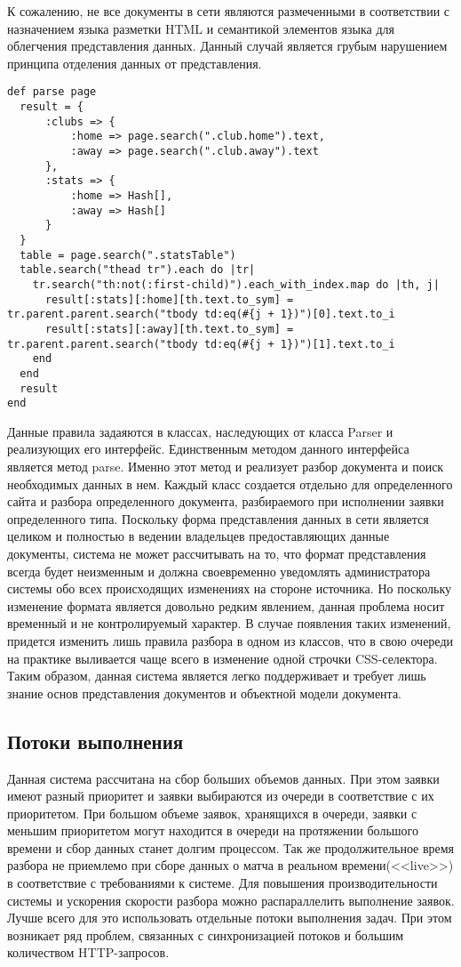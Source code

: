 К сожалению, не все документы в сети являются размеченными в соответствии с назначением языка разметки HTML и семантикой элементов языка для облегчения представления данных. Данный случай является грубым нарушением принципа отделения данных от представления. 

\begin{lstlisting}[caption=Разбора статистики матча]
def parse page
  result = {
      :clubs => {
          :home => page.search(".club.home").text,
          :away => page.search(".club.away").text
      },
      :stats => {
          :home => Hash[],
          :away => Hash[]
      }
  }
  table = page.search(".statsTable")
  table.search("thead tr").each do |tr|
    tr.search("th:not(:first-child)").each_with_index.map do |th, j|
      result[:stats][:home][th.text.to_sym] = tr.parent.parent.search("tbody td:eq(#{j + 1})")[0].text.to_i
      result[:stats][:away][th.text.to_sym] = tr.parent.parent.search("tbody td:eq(#{j + 1})")[1].text.to_i
    end
  end
  result
end
\end{lstlisting}

Данные правила задаяются в классах, наследующих от класса Parser и реализующих его интерфейс. Единственным методом данного интерфейса является метод parse. Именно этот метод и реализует разбор документа и поиск необходимых данных в нем. Каждый класс создается отдельно для определенного сайта и разбора определенного документа, разбираемого при исполнении заявки определенного типа. Поскольку форма представления данных в сети является целиком и полностью в ведении владельцев предоставляющих данные документы, система не может рассчитывать на то, что формат представления всегда будет неизменным и должна своевременно уведомлять администратора системы обо всех происходящих изменениях на стороне источника. Но поскольку изменение формата является довольно редким явлением, данная проблема носит временный и не контролируемый характер. В случае появления таких изменений, придется изменить лишь правила разбора в одном из классов, что в свою очереди на практике выливается чаще всего в изменение одной строчки CSS-селектора. Таким образом, данная система является легко поддерживает и требует лишь знание основ представления документов и объектной модели документа. 

\subsection{Потоки выполнения}
Данная система рассчитана на сбор больших объемов данных. При этом заявки имеют разный приоритет и заявки выбираются из очереди в соответствие с их приоритетом. При большом объеме заявок, хранящихся в очереди, заявки с меньшим приоритетом могут находится в очереди на протяжении большого времени и сбор данных станет долгим процессом. Так же продолжительное время разбора не приемлемо при сборе данных о матча в реальном времени(<<live>>) в соответствие с требованиями к системе. Для повышения производительности системы и ускорения скорости разбора можно распараллелить выполнение заявок. Лучше всего для это использовать отдельные потоки выполнения задач. При этом возникает ряд проблем, связанных с синхронизацией потоков и большим количеством HTTP-запросов. 

